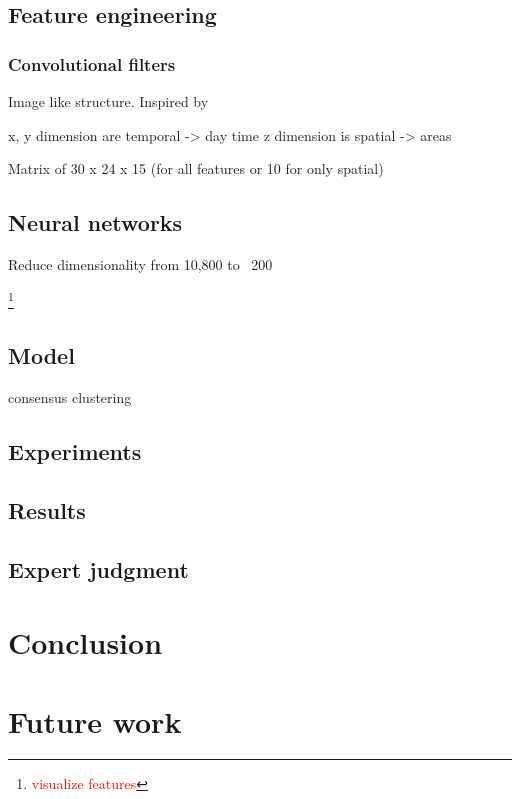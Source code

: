 \documentclass{article}
\newcommand{\selfnote}[1]{\footnote{\textcolor{red}{#1}}}
\begin{document}
\subsection{Feature engineering}
\subsubsection{Convolutional filters}
Image like structure. Inspired by \cite{langlois2016inferring}

x, y dimension are temporal -> day time
z dimension is spatial -> areas 

Matrix of 30 x 24 x 15 (for all features or 10 for only spatial)

\subsection{Neural networks}
Reduce dimensionality from 10,800 to ~200

\selfnote{visualize features}

\subsection{Model}
consensus clustering

\subsection{Experiments}

\subsection{Results}

\subsection{Expert judgment}


\newpage
\section{Conclusion}


\newpage
\section{Future work}

\newpage
{}

\end{document}
